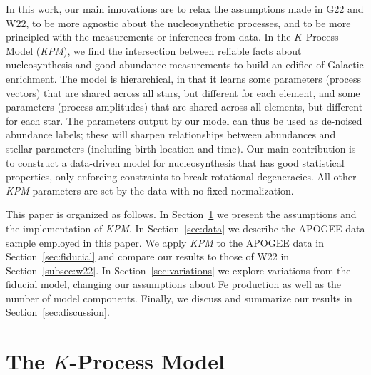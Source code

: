 \documentclass[modern, linenumbers]{aastex631}
\newcommand{\name}{\textsl{KPM}}
\begin{document}
In this work, our main innovations are to relax the assumptions made in G22 and W22, to be more agnostic about the nucleosynthetic processes, and to be more principled with the measurements or inferences from data.
In the $K$ Process Model (\name{}), we find the intersection between reliable facts about nucleosynthesis and good abundance measurements to build an edifice of Galactic enrichment.
The model is hierarchical, in that it learns some parameters (process vectors) that are shared across all stars, but different for each element, and some parameters (process amplitudes) that are shared across all elements, but different for each star.
The parameters output by our model can thus be used as de-noised abundance labels; these will sharpen relationships between abundances and stellar parameters (including birth location and time). Our main contribution is to construct a data-driven model for nucleosynthesis that has good statistical properties, only enforcing constraints to break rotational degeneracies. All other \name{} parameters are set by the data with no fixed normalization.

This paper is organized as follows. In Section~\ref{sec:model} we present the assumptions and the implementation of \name{}. In Section~\ref{sec:data} we describe the APOGEE data sample employed in this paper.  We apply \name{} to the APOGEE data in Section~\ref{sec:fiducial} and compare our results to those of W22 in Section~\ref{subsec:w22}. In Section~\ref{sec:variations} we explore variations from the fiducial model, changing our assumptions about Fe production as well as the number of model components. Finally, we discuss and summarize our results in Section~\ref{sec:discussion}.

\section{The $K$-Process Model}\label{sec:model}
\end{document}
